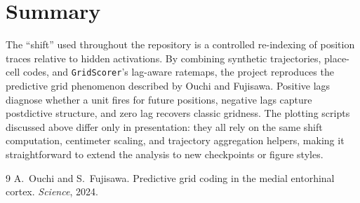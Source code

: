 \documentclass[11pt]{article}
\begin{document}
\section{Summary}
The ``shift'' used throughout the repository is a controlled re-indexing of position traces relative to hidden activations. By combining synthetic trajectories, place-cell codes, and \texttt{GridScorer}'s lag-aware ratemaps, the project reproduces the predictive grid phenomenon described by Ouchi and Fujisawa. Positive lags diagnose whether a unit fires for future positions, negative lags capture postdictive structure, and zero lag recovers classic gridness. The plotting scripts discussed above differ only in presentation: they all rely on the same shift computation, centimeter scaling, and trajectory aggregation helpers, making it straightforward to extend the analysis to new checkpoints or figure styles.

\begin{thebibliography}{9}
A.~Ouchi and S.~Fujisawa.
\newblock Predictive grid coding in the medial entorhinal cortex.
\newblock \emph{Science}, 2024.
\end{thebibliography}
\end{document}
